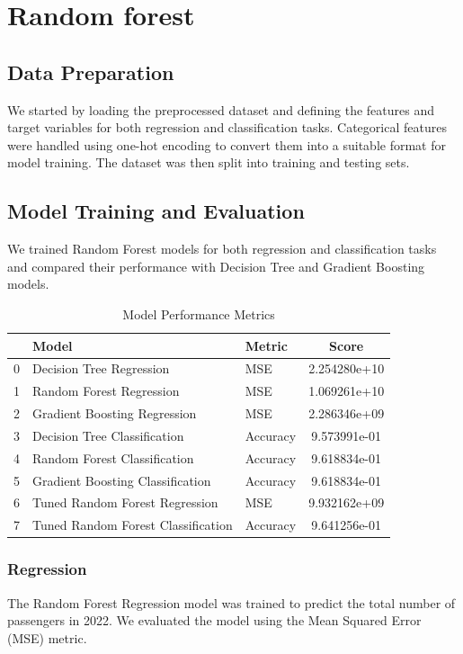 \section{Random forest}

\subsection{Data Preparation}
We started by loading the preprocessed dataset and defining the features and target variables for both regression and classification tasks. Categorical features were handled using one-hot encoding to convert them into a suitable format for model training. The dataset was then split into training and testing sets.

\subsection{Model Training and Evaluation}
We trained Random Forest models for both regression and classification tasks and compared their performance with Decision Tree and Gradient Boosting models.

\begin{table}[h]
    \centering
    \begin{tabular}{lllc}
        \toprule
        {} & Model & Metric & Score \\
        \midrule
        0 & Decision Tree Regression & MSE & 2.254280e+10 \\
        1 & Random Forest Regression & MSE & 1.069261e+10 \\
        2 & Gradient Boosting Regression & MSE & 2.286346e+09 \\
        3 & Decision Tree Classification & Accuracy & 9.573991e-01 \\
        4 & Random Forest Classification & Accuracy & 9.618834e-01 \\
        5 & Gradient Boosting Classification & Accuracy & 9.618834e-01 \\
        6 & Tuned Random Forest Regression & MSE & 9.932162e+09 \\
        7 & Tuned Random Forest Classification & Accuracy & 9.641256e-01 \\
        \bottomrule
    \end{tabular}
    \caption{Model Performance Metrics}
    \label{tab:model_performance}
\end{table}

\subsubsection{Regression}
The Random Forest Regression model was trained to predict the total number of passengers in 2022. We evaluated the model using the Mean Squared Error (MSE) metric.

